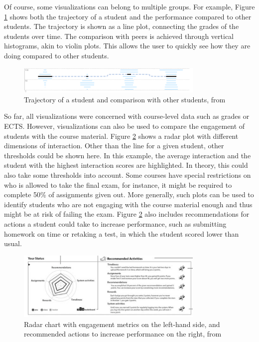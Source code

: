 Of course, some visualizations can belong to multiple groups. For example, Figure \ref{fig:comparison_trend} shows both the trajectory of a student and the performance compared to other students. The trajectory is shown as a line plot, connecting the grades of the students over time. The comparison with peers is achieved through vertical histograms, akin to violin plots. This allows the user to quickly see how they are doing compared to other students.

\begin{figure}
    \centering
    \includegraphics[width=0.8\textwidth]{figures/comp_trend.png}
    \caption{Trajectory of a student and comparison with other students, from \cite{LISSA}}
    \label{fig:comparison_trend}
\end{figure}

So far, all visualizations were concerned with course-level data such as grades or ECTS. However, visualizations can also be used to compare the engagement of students with the course material. Figure \ref{fig:comp_engagement.png} shows a radar plot with different dimensions of interaction. Other than the line for a given student, other thresholds could be shown here. In this example, the average interaction and the student with the highest interaction scores are highlighted. In theory, this could also take some thresholds into account. Some courses have special restrictions on who is allowed to take the final exam, for instance, it might be required to complete 50\% of assignments given out.
More generally, such plots can be used to identify students who are not engaging with the course material enough and thus might be at risk of failing the exam. Figure \ref{fig:comp_engagement.png} also includes recommendations for actions a student could take to increase performance, such as submitting homework on time or retaking a test, in which the student scored lower than usual.

\begin{figure}
    \centering
    \includegraphics[width=0.8\textwidth]{figures/comp_engagement.png}
    \caption{Radar chart with engagement metrics on the left-hand side, and recommended actions to increase performance on the right, from \cite{StudentFacingDashboard}}
    \label{fig:comp_engagement.png}
\end{figure}

